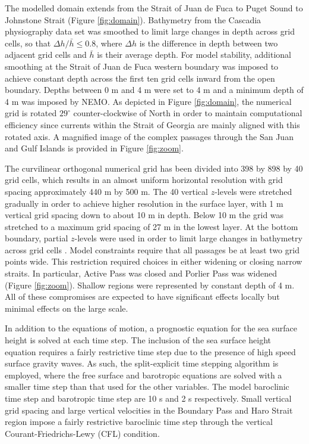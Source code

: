 \documentclass[letterpaper]{tATO2e}
\begin{document}
The modelled domain extends from the Strait of Juan de Fuca to Puget Sound to Johnstone Strait (Figure \ref{fig:domain}). Bathymetry from the Cascadia physiography data set \citep{haugerud1999digital} was smoothed to limit large changes in depth across grid cells, so that $\Delta h/\bar{h} \leq 0.8$, where $\Delta h$ is the difference in depth between two adjacent grid cells and $\bar{h}$ is their average depth. For model stability, additional smoothing at the Strait of Juan de Fuca western boundary was imposed to achieve constant depth across the first ten grid cells {\color{red} inward from the open boundary. Depths between 0 m and 4 m were set to 4 m and a minimum depth of 4 m was imposed by NEMO.}  As depicted in Figure \ref{fig:domain}, the numerical grid is rotated $29^{\circ}$ counter-clockwise of North in order to maintain computational efficiency since currents within the Strait of Georgia are mainly aligned with this rotated axis. {\color{red} A magnified image of the complex passages through the San Juan and Gulf Islands is provided in Figure \ref{fig:zoom}.}

The curvilinear orthogonal numerical grid has been divided into 398 by 898 by 40 grid cells, which results in an almost uniform horizontal resolution with grid spacing approximately 440 m by 500 m. The 40 vertical $z$-levels were stretched gradually in order to achieve higher resolution in the surface layer, with 1 m vertical grid spacing down to about 10 m in depth. Below 10 m the grid was stretched to a maximum grid spacing of 27 m in the lowest layer. At the bottom boundary, partial $z$-levels were used in order to limit large changes in bathymetry across grid cells \citep{madec2012nemo}. {\color{red} Model constraints require that all passages be at least two grid points wide.  This restriction required choices in either widening or closing narrow straits.  In particular, Active Pass was closed and Porlier Pass was widened (Figure \ref{fig:zoom}).  Shallow regions were represented by constant depth of 4 m.  All of these compromises are expected to have significant effects locally but minimal effects on the large scale.}

In addition to the equations of motion, a prognostic equation for the sea surface height is solved at each time step. The inclusion of the sea surface height equation requires a fairly restrictive time step due to the presence of high speed surface gravity waves. As such, the split-explicit time stepping algorithm is employed, where the free surface and barotropic equations are solved with a smaller time step than that used for the other variables. The model baroclinic time step and barotropic time step are 10 s and 2 s respectively. Small vertical grid spacing and large vertical velocities in the Boundary Pass and Haro Strait region impose a fairly restrictive baroclinic time step through the vertical Courant-Friedrichs-Lewy (CFL) condition.
\end{document}
